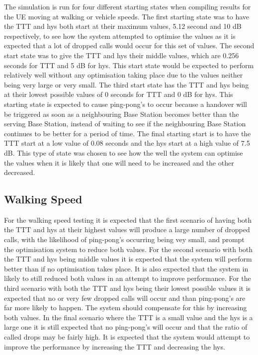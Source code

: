 The simulation is run for four different starting states when compiling results for the UE moving at walking or vehicle speeds. The first starting state was to have the TTT and hys both start at their maximum values, 5.12 second and 10 dB respectively, to see how the system attempted to optimise the values as it is expected that a lot of dropped calls would occur for this set of values. The second start state was to give the TTT and hys their middle values, which are 0.256 seconds for TTT and 5 dB for hys. This start state would be expected to perform relatively well without any optimisation taking place due to the values neither being very large or very small. The third start state has the TTT and hys being at their lowest possible values of 0 seconds for TTT and 0 dB for hys. This starting state is expected to cause ping-pong's to occur because a handover will be triggered as soon as a neighbouring Base Station becomes better than the serving Base Station, instead of waiting to see if the neighbouring Base Station continues to be better for a period of time. The final starting start is to have the TTT start at a low value of 0.08 seconds and the hys start at a high value of 7.5 dB. This type of state was chosen to see how the well the system can optimise the values when it is likely that one will need to be increased and the other decreased.
\subsection{Walking Speed}
For the walking speed testing it is expected that the first scenario of having both the TTT and hys at their highest values will produce a large number of dropped calls, with the likelihood of ping-pong's occurring being vey small, and prompt the optimisation system to reduce both values. For the second scenario with both the TTT and hys being middle values it is expected that the system will perform better than if no optimisation takes place. It is also expected that the system in likely to still reduced both values in an attempt to improve performance. For the third scenario with both the TTT and hys being their lowest possible values it is expected that no or very few dropped calls will occur and than ping-pong's are far more likely to happen. The system should compensate for this by increasing both values. In the final scenario where the TTT is a small value and the hys is a large one it is still expected that no ping-pong's will occur and that the ratio of called drops may be fairly high. It is expected that the system would attempt to improve the performance by increasing the TTT and decreasing the hys.
